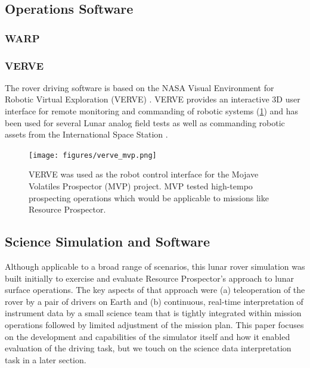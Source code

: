\documentclass[twocolumn,letterpaper]{IEEEAerospaceCLS}  %
\begin{document}
\subsection{Operations Software}

\subsubsection{WARP}

\cite{trimble2016open} 

\subsubsection{VERVE}

The rover driving software is based on the NASA Visual Environment for Robotic Virtual Exploration (VERVE) \cite{lee2013reusable}. VERVE provides an interactive 3D user interface for remote monitoring and commanding of robotic systems (\cref{fig:verve-mvp}) and has been used for several Lunar analog field tests \cite{deans2009robotic} \cite{fong2010robotic} as well as commanding robotic assets from the International Space Station \cite{bualat2013surface}.

\begin{figure}[htp]
\centering
\texttt{[image: figures/verve\_mvp.png]}
\caption{VERVE was used as the robot control interface for the Mojave Volatiles Prospector (MVP) project.  MVP tested high-tempo prospecting operations which would be applicable to missions like Resource Prospector.\label{fig:verve-mvp}}
\end{figure}

\subsection{Science Simulation and Software}

Although applicable to a broad range of scenarios, this lunar rover simulation was built initially to exercise and evaluate Resource Prospector's approach to lunar surface operations.  The key aspects of that approach were (a) teleoperation of the rover by a pair of drivers on Earth and (b) continuous, real-time interpretation of instrument data by a small science team that is tightly integrated within mission operations followed by limited adjustment of the mission plan.  This paper focuses on the development and capabilities of the simulator itself and how it enabled evaluation of the driving task, but we touch on the science data interpretation task in a later section.
\end{document}
